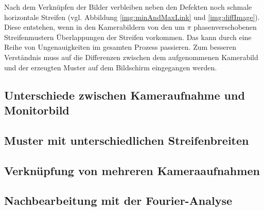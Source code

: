 Nach dem Verknüpfen der Bilder verbleiben neben den Defekten noch schmale horizontale Streifen (vgl. Abbildung \ref{img:minAndMaxLink} und \ref{img:diffImage}).
Diese entstehen, wenn in den Kamerabildern von den um $\pi$ phasenverschobenen Streifenmustern Überlappungen der Streifen vorkommen.
Das kann durch eine Reihe von Ungenauigkeiten im gesamten Prozess passieren.
Zum besseren Verständnis muss auf die Differenzen zwischen dem aufgenommenen Kamerabild und der erzeugten Muster auf dem Bildschirm eingegangen werden.

{
	\FloatBarrier
    \subsection{Unterschiede zwischen Kameraufnahme und Monitorbild}
    \label{sub:unterschiedeKameraUndMonitor}
    
}

{
	\FloatBarrier
    \subsection{Muster mit unterschiedlichen Streifenbreiten}
    \label{sub:musterUnterschiedlichenStreifenbreiten}
    
}

{
	\FloatBarrier
    \subsection{Verknüpfung von mehreren Kameraaufnahmen}
    \label{sub:verknuepfungMehrererKameraaufnahmen}
    
}

{
	\FloatBarrier
    \subsection{Nachbearbeitung mit der Fourier-Analyse}
    \label{sub:nachbearbeitungFourierAnalyse}
    
}

